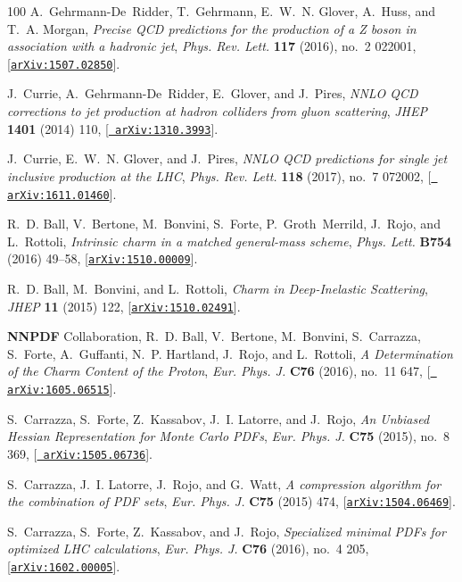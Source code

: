 \begin{thebibliography}{100}
A.~Gehrmann-De~Ridder, T.~Gehrmann, E.~W.~N. Glover, A.~Huss, and T.~A. Morgan,
  {\it {Precise QCD predictions for the production of a Z boson in association
  with a hadronic jet}},  {\em Phys. Rev. Lett.} {\bf 117} (2016), no.~2
  022001, [\href{http://arxiv.org/abs/1507.02850}{{\tt arXiv:1507.02850}}].

J.~Currie, A.~Gehrmann-De~Ridder, E.~Glover, and J.~Pires, {\it {NNLO QCD
  corrections to jet production at hadron colliders from gluon scattering}},
  {\em JHEP} {\bf 1401} (2014) 110, [\href{http://arxiv.org/abs/1310.3993}{{\tt
  arXiv:1310.3993}}].

J.~Currie, E.~W.~N. Glover, and J.~Pires, {\it {NNLO QCD predictions for single
  jet inclusive production at the LHC}},  {\em Phys. Rev. Lett.} {\bf 118}
  (2017), no.~7 072002, [\href{http://arxiv.org/abs/1611.01460}{{\tt
  arXiv:1611.01460}}].

R.~D. Ball, V.~Bertone, M.~Bonvini, S.~Forte, P.~Groth~Merrild, J.~Rojo, and
  L.~Rottoli, {\it {Intrinsic charm in a matched general-mass scheme}},  {\em
  Phys. Lett.} {\bf B754} (2016) 49--58,
  [\href{http://arxiv.org/abs/1510.00009}{{\tt arXiv:1510.00009}}].

R.~D. Ball, M.~Bonvini, and L.~Rottoli, {\it {Charm in Deep-Inelastic
  Scattering}},  {\em JHEP} {\bf 11} (2015) 122,
  [\href{http://arxiv.org/abs/1510.02491}{{\tt arXiv:1510.02491}}].

{\bf NNPDF} Collaboration, R.~D. Ball, V.~Bertone, M.~Bonvini, S.~Carrazza,
  S.~Forte, A.~Guffanti, N.~P. Hartland, J.~Rojo, and L.~Rottoli, {\it {A
  Determination of the Charm Content of the Proton}},  {\em Eur. Phys. J.} {\bf
  C76} (2016), no.~11 647, [\href{http://arxiv.org/abs/1605.06515}{{\tt
  arXiv:1605.06515}}].

S.~Carrazza, S.~Forte, Z.~Kassabov, J.~I. Latorre, and J.~Rojo, {\it {An
  Unbiased Hessian Representation for Monte Carlo PDFs}},  {\em Eur. Phys. J.}
  {\bf C75} (2015), no.~8 369, [\href{http://arxiv.org/abs/1505.06736}{{\tt
  arXiv:1505.06736}}].

S.~Carrazza, J.~I. Latorre, J.~Rojo, and G.~Watt, {\it {A compression algorithm
  for the combination of PDF sets}},  {\em Eur. Phys. J.} {\bf C75} (2015) 474,
  [\href{http://arxiv.org/abs/1504.06469}{{\tt arXiv:1504.06469}}].

S.~Carrazza, S.~Forte, Z.~Kassabov, and J.~Rojo, {\it {Specialized minimal PDFs
  for optimized LHC calculations}},  {\em Eur. Phys. J.} {\bf C76} (2016),
  no.~4 205, [\href{http://arxiv.org/abs/1602.00005}{{\tt arXiv:1602.00005}}].


\end{thebibliography}
